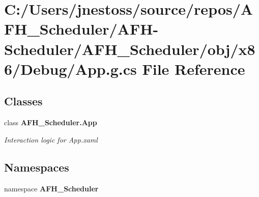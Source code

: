 \section{C\+:/\+Users/jnestoss/source/repos/\+A\+F\+H\+\_\+\+Scheduler/\+A\+F\+H-\/\+Scheduler/\+A\+F\+H\+\_\+\+Scheduler/obj/x86/\+Debug/\+App.g.\+cs File Reference}
\label{x86_2_debug_2_app_8g_8cs}
\subsection*{Classes}
\begin{DoxyCompactItemize}
\item 
class \textbf{ A\+F\+H\+\_\+\+Scheduler.\+App}
\begin{DoxyCompactList}\small\item\em Interaction logic for App.\+xaml \end{DoxyCompactList}\end{DoxyCompactItemize}
\subsection*{Namespaces}
\begin{DoxyCompactItemize}
\item 
namespace \textbf{ A\+F\+H\+\_\+\+Scheduler}
\end{DoxyCompactItemize}

